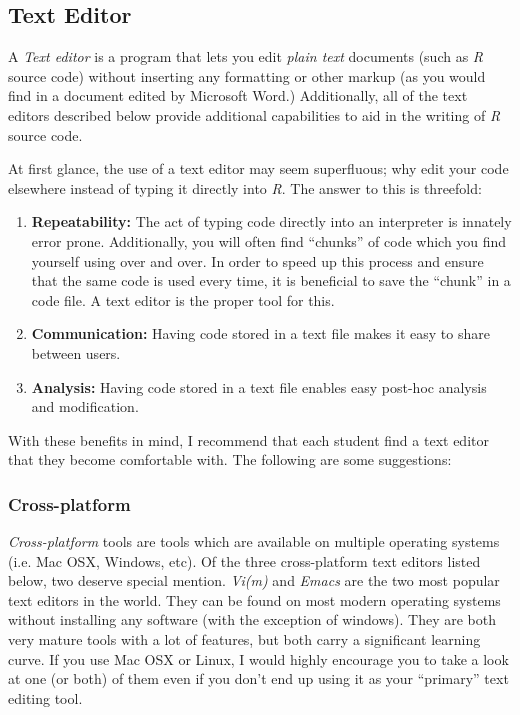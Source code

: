 \documentclass[10pt,letterpaper]{article}
\begin{document}
\subsection{Text Editor}

A \emph{Text editor} is a program that lets you edit \emph{plain text} documents (such as \emph{R} source code) without inserting any formatting or other markup (as you would find in a document edited by Microsoft Word.)  Additionally, all of the text editors described below provide additional capabilities to aid in the writing of \emph{R} source code.

At first glance, the use of a text editor may seem superfluous; why edit your code elsewhere instead of typing it directly into \emph{R}.  The answer to this is threefold:
\begin{enumerate}
  \item \textbf{Repeatability:} The act of typing code directly into an interpreter is innately error prone.  Additionally, you will often find ``chunks'' of code which you find yourself using over and over.  In order to speed up this process and ensure that the same code is used every time, it is beneficial to save the ``chunk'' in a code file.  A text editor is the proper tool for this.
  \item \textbf{Communication:} Having code stored in a text file makes it easy to share between users.
  \item \textbf{Analysis:} Having code stored in a text file enables easy post-hoc analysis and modification.
\end{enumerate}

With these benefits in mind, I recommend that each student find a text editor that they become comfortable with.  The following are some suggestions:

\subsubsection{Cross-platform} %
\label{ssub:cross_platform}

\emph{Cross-platform} tools are tools which are available on multiple operating systems (i.e. Mac OSX, Windows, etc).  Of the three cross-platform text editors listed below, two deserve special mention.  \emph{Vi(m)} and \emph{Emacs} are the two most popular text editors in the world.  They can be found on most modern operating systems without installing any software (with the exception of windows).  They are both very mature tools with a lot of features, but both carry a significant learning curve.  If you use Mac OSX or Linux, I would highly encourage you to take a look at one (or both) of them even if you don't end up using it as your ``primary'' text editing tool.
\end{document}
